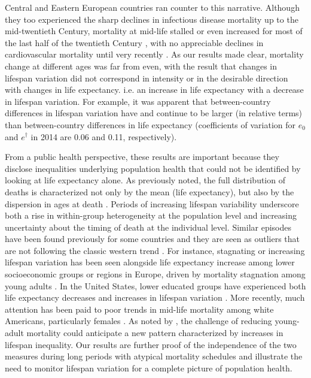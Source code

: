 \documentclass{article}
\begin{document}
\begin{spacing}{1.5}
Central and Eastern European countries ran counter to this narrative. Although they too experienced the sharp declines in infectious disease mortality up to the mid-twentieth Century, mortality at mid-life stalled or even increased for most of the last half of the twentieth Century \citep{mckee2001}, with no appreciable declines in cardiovascular mortality until very recently \citep{caselli2002epidemiologic, grigoriev2014recent,mesle2004mortality,Timonin2017}. As our results made clear, mortality change at different ages was far from even, with the result that changes in lifespan variation did not correspond in intensity or in the desirable direction with changes in life expectancy. i.e. an increase in life expectancy with a decrease in lifespan variation. For example, it was apparent that between-country differences in lifespan variation have and continue to be larger (in relative terms) than between-country differences in life expectancy (coefficients of variation for $e_0$ and $e^\dagger$ in 2014 are 0.06 and 0.11, respectively). 

From a public health perspective, these results are important because they disclose inequalities underlying population health that could not be identified by looking at life expectancy alone. As previously noted, the full distribution of deaths is characterized not only by the mean (life expectancy), but also by the dispersion in ages at death \citep{edwards2005}. Periods of increasing lifespan variability underscore both a rise in within-group heterogeneity at the population level and increasing uncertainty about the timing of death at the individual level. Similar episodes have been found previously for some countries and they are seen as outliers that are not following the classic western trend \citep{wilmoth1999}. For instance, stagnating or increasing lifespan variation has been seen alongside life expectancy increase among lower socioeconomic groups or regions in Europe, driven by mortality stagnation among young adults \citep{vanraalte2014,bronnum-hansen2017,seaman2016increasing}. In the United States, lower educated groups have experienced both life expectancy decreases and increases in lifespan variation \citep{sasson2016trends}. More recently, much attention has been paid to poor trends in mid-life mortality among white Americans, particularly females \citep{case2015rising,montez2013trends}. As noted by \citet{gillespie2014divergence}, the challenge of reducing young-adult mortality could anticipate a new pattern characterized by increases in lifespan inequality. Our results are further proof of the independence of the two measures during long periods with atypical mortality schedules and illustrate the need to monitor lifespan variation for a complete picture of population health.\\


\end{spacing}
\end{document}
